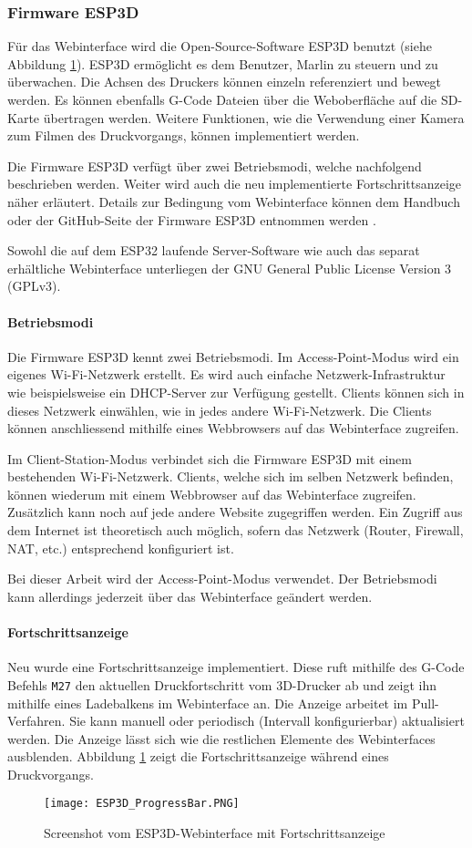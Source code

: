 \subsubsection{Firmware ESP3D}
\label{sec:ESP3D}

Für das Webinterface wird die Open-Source-Software ESP3D benutzt (siehe Abbildung \ref{pic:ESP3D_ProgressBar}). ESP3D ermöglicht es dem Benutzer, Marlin zu steuern und zu überwachen. Die Achsen des Druckers können einzeln referenziert und bewegt werden. Es können ebenfalls G-Code Dateien über die Weboberfläche auf die SD-Karte übertragen werden. Weitere Funktionen, wie die Verwendung einer Kamera zum Filmen des Druckvorgangs, können implementiert werden.

Die Firmware ESP3D verfügt über zwei Betriebsmodi, welche nachfolgend beschrieben werden. Weiter wird auch die neu implementierte Fortschrittsanzeige näher erläutert.
Details zur Bedingung vom Webinterface können dem Handbuch oder der GitHub-Seite der Firmware ESP3D entnommen werden \cite{ESP3D, ESP3D-WEBUI}.

Sowohl die auf dem ESP32 laufende Server-Software wie auch das separat erhältliche Webinterface unterliegen der GNU General Public License Version 3 (GPLv3).

\paragraph{Betriebsmodi}
Die Firmware ESP3D kennt zwei Betriebsmodi. Im Access-Point-Modus wird ein eigenes Wi-Fi-Netzwerk erstellt. Es wird auch einfache Netzwerk-Infrastruktur wie beispielsweise ein DHCP-Server zur Verfügung gestellt. Clients können sich in dieses Netzwerk einwählen, wie in jedes andere Wi-Fi-Netzwerk. Die Clients können anschliessend mithilfe eines Webbrowsers auf das Webinterface zugreifen.

Im Client-Station-Modus verbindet sich die Firmware ESP3D mit einem bestehenden Wi-Fi-Netzwerk. Clients, welche sich im selben Netzwerk befinden, können wiederum mit einem Webbrowser auf das Webinterface zugreifen. Zusätzlich kann noch auf jede andere Website zugegriffen werden. Ein Zugriff aus dem Internet ist theoretisch auch möglich, sofern das Netzwerk (Router, Firewall, NAT, etc.) entsprechend konfiguriert ist.

Bei dieser Arbeit wird der Access-Point-Modus verwendet. Der Betriebsmodi kann allerdings jederzeit über das Webinterface geändert werden.

\paragraph{Fortschrittsanzeige}
Neu wurde eine Fortschrittsanzeige implementiert. Diese ruft mithilfe des G-Code Befehls \texttt{M27} den aktuellen Druckfortschritt vom 3D-Drucker ab und zeigt ihn mithilfe eines Ladebalkens im Webinterface an. Die Anzeige arbeitet im Pull-Verfahren. Sie kann manuell oder periodisch (Intervall konfigurierbar) aktualisiert werden. Die Anzeige lässt sich wie die restlichen Elemente des Webinterfaces ausblenden. Abbildung \ref{pic:ESP3D_ProgressBar} zeigt die Fortschrittsanzeige während eines Druckvorgangs.

\begin{figure}[h]
	\centering
	\texttt{[image: ESP3D\_ProgressBar.PNG]}
	\caption{Screenshot vom ESP3D-Webinterface mit Fortschrittsanzeige}
	\label{pic:ESP3D_ProgressBar}
\end{figure}

